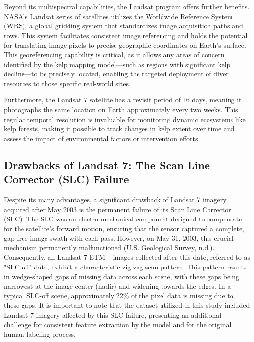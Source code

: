 \documentclass{article}
\begin{document}
Beyond its multispectral capabilities, the Landsat program offers further benefits. NASA's Landsat series of satellites utilizes the Worldwide Reference System (WRS), a global gridding system that standardizes image acquisition paths and rows. This system facilitates consistent image referencing and holds the potential for translating image pixels to precise geographic coordinates on Earth's surface. This georeferencing capability is critical, as it allows any areas of concern identified by the kelp mapping model—such as regions with significant kelp decline—to be precisely located, enabling the targeted deployment of diver resources to those specific real-world sites. 
        
Furthermore, the Landsat 7 satellite has a revisit period of 16 days, meaning it photographs the same location on Earth approximately every two weeks. This regular temporal resolution is invaluable for monitoring dynamic ecosystems like kelp forests, making it possible to track changes in kelp extent over time and assess the impact of environmental factors or intervention efforts.

\subsection{Drawbacks of Landsat 7: The Scan Line Corrector (SLC) Failure} 

Despite its many advantages, a significant drawback of Landsat 7 imagery acquired after May 2003 is the permanent failure of its Scan Line Corrector (SLC). The SLC was an electro-mechanical component designed to compensate for the satellite's forward motion, ensuring that the sensor captured a complete, gap-free image swath with each pass. However, on May 31, 2003, this crucial mechanism permanently malfunctioned (U.S. Geological Survey, n.d.). Consequently, all Landsat 7 ETM+ images collected after this date, referred to as "SLC-off" data, exhibit a characteristic zig-zag scan pattern. This pattern results in wedge-shaped gaps of missing data across each scene, with these gaps being narrowest at the image center (nadir) and widening towards the edges. In a typical SLC-off scene, approximately 22\% of the pixel data is missing due to these gaps. It is important to note that the dataset utilized in this study included Landsat 7 imagery affected by this SLC failure, presenting an additional challenge for consistent feature extraction by the model and for the original human labeling process.
\end{document}
